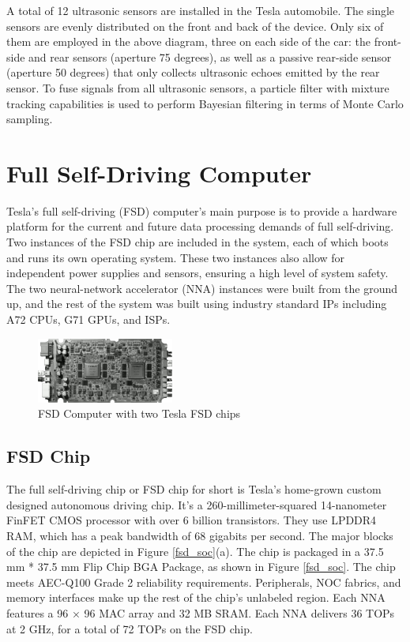 \documentclass[letterpaper, 10 pt, conference]{ieeeconf}  %
\begin{document}
A total of 12 ultrasonic sensors are installed in the Tesla automobile. The single sensors are evenly distributed on the front and back of the device. Only six of them are employed in the above diagram, three on each side of the car: the front-side and rear sensors (aperture 75 degrees), as well as a passive rear-side sensor (aperture 50 degrees) that only collects ultrasonic echoes emitted by the rear sensor. To fuse signals from all ultrasonic sensors, a particle filter with mixture tracking capabilities is used to perform Bayesian filtering in terms of Monte Carlo sampling.


\section{Full Self-Driving Computer}

Tesla's full self-driving (FSD) computer's main purpose is to provide a hardware platform for the current and future data processing demands of full self-driving. Two instances of the FSD chip are included in the system, each of which boots and runs its own operating system. These two instances also allow for independent power supplies and sensors, ensuring a high level of system safety\cite{fsd_computer}. The two neural-network accelerator (NNA) instances were built from the ground up, and the rest of the system was built using industry standard IPs including A72 CPUs, G71 GPUs, and ISPs.

\begin{figure}[hbt!]
\centering
\includegraphics[width=0.4\textwidth]{gfx/900px-tesla_fsd_computer_board.png}
\caption{FSD Computer with two Tesla FSD chips}
\end{figure}


\subsection{FSD Chip}

The full self-driving chip or FSD chip for short is Tesla's home-grown custom designed autonomous driving chip. It's a 260-millimeter-squared 14-nanometer FinFET CMOS processor with over 6 billion transistors. They use LPDDR4 RAM, which has a peak bandwidth of 68 gigabits per second\cite{wikichip}. The major blocks of the chip are depicted in Figure \ref{fsd_soc}(a). The chip is packaged in a 37.5 mm * 37.5 mm Flip Chip BGA Package, as shown in Figure \ref{fsd_soc}. The chip meets AEC-Q100 Grade 2 reliability requirements. Peripherals, NOC fabrics, and memory interfaces make up the rest of the chip's unlabeled region. Each NNA features a 96 × 96 MAC array and 32 MB SRAM. Each NNA delivers 36 TOPs at 2 GHz, for a total of 72 TOPs on the FSD chip\cite{fsd_computer}.
\end{document}

